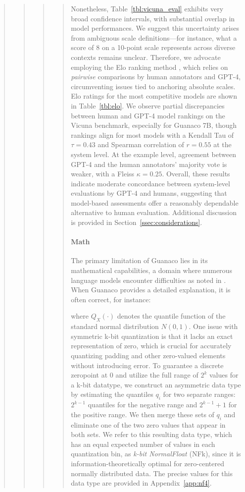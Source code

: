 \begin{quote}
\begin{quote}
\begin{quote}
\begin{quote}
Nonetheless, Table~\ref{tbl:vicuna_eval} exhibits very broad confidence intervals, with substantial overlap in model performances. We suggest this uncertainty arises from ambiguous scale definitions—for instance, what a score of 8 on a 10-point scale represents across diverse contexts remains unclear. Therefore, we advocate employing the Elo ranking method \citep{elo1967proposed}, which relies on \textit{pairwise} comparisons by human annotators and GPT-4, circumventing issues tied to anchoring absolute scales. Elo ratings for the most competitive models are shown in Table~\ref{tbl:elo}. We observe partial discrepancies between human and GPT-4 model rankings on the Vicuna benchmark, especially for Guanaco 7B, though rankings align for most models with a Kendall Tau of $\tau=0.43$ and Spearman correlation of $r=0.55$ at the system level. At the example level, agreement between GPT-4 and the human annotators’ majority vote is weaker, with a Fleiss $\kappa=0.25$. Overall, these results indicate moderate concordance between system-level evaluations by GPT-4 and humans, suggesting that model-based assessments offer a reasonably dependable alternative to human evaluation. Additional discussion is provided in Section~\ref{ssec:considerations}.

\paragraph{Math} The primary limitation of {Guanaco} lies in its mathematical capabilities, a domain where numerous language models encounter difficulties as noted in \citep{liang2022holistic}. When {Guanaco} provides a detailed explanation, it is often correct, for instance:

where $Q_X(\cdot)$ denotes the quantile function of the standard normal distribution $N(0,1)$. One issue with symmetric k-bit quantization is that it lacks an exact representation of zero, which is crucial for accurately quantizing padding and other zero-valued elements without introducing error. To guarantee a discrete zeropoint at $0$ and utilize the full range of $2^k$ values for a k-bit datatype, we construct an asymmetric data type by estimating the quantiles $q_i$ for two separate ranges: $2^{k-1}$ quantiles for the negative range and $2^{k-1}+1$ for the positive range. We then merge these sets of $q_i$ and eliminate one of the two zero values that appear in both sets. We refer to this resulting data type, which has an equal expected number of values in each quantization bin, as \emph{k-bit NormalFloat} (NFk), since it is information-theoretically optimal for zero-centered normally distributed data. The precise values for this data type are provided in Appendix~\ref{app:nf4}.


\end{quote}
\end{quote}
\end{quote}
\end{quote}
